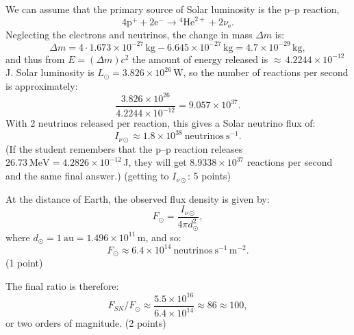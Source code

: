 We can assume that the primary source of Solar luminosity is the p--p reaction,
\[
  4\mathrm{p}^+ + 2\mathrm{e}^- \to {}^4\mathrm{He}^{2+} + 2\nu_{\mathrm{e}}.
\]
Neglecting the electrons and neutrinos, the change in mass $\Delta m$ is:
\[
  \Delta m = 4 \cdot 1.673 \times 10^{-27}\,\mathrm{kg}
  - 6.645 \times 10^{-27}\,\mathrm{kg}
  = 4.7 \times 10^{-29}\,\mathrm{kg},
\]
and thus from $E = (\Delta m)c^2$ the amount of energy released is
${\approx}\,4.2244 \times 10^{-12}$\,J. Solar luminosity is
$L_\odot = 3.826 \times 10^{26}$\,W, so the number of reactions per second is
approximately:
\[
  \frac{3.826 \times 10^{26}}{4.2244 \times 10^{-12}} = 9.057 \times 10^{37}.
\]
With 2 neutrinos released per reaction, this gives a Solar neutrino flux of:
\[
  I_{\nu\odot} \approx 1.8 \times 10^{38}\ \mathrm{neutrinos\ s^{-1}}.
\]
(If the student remembers that the p--p reaction releases
$26.73\ \mathrm{MeV} = 4.2826 \times 10^{-12}$\,J, they will get
$8.9338 \times 10^{37}$ reactions per second and the same final answer.)
\hfill(getting to $I_{\nu\odot}$: 5 points)

At the distance of Earth, the observed flux density is given by:
\[
  F_\odot = \frac{I_{\nu\odot}}{4\pi d_\odot^2},
\]
where $d_\odot = 1\ \mathrm{au} = 1.496 \times 10^{11}$\,m, and so:
\[
  F_\odot \approx 6.4 \times 10^{14}\ \mathrm{neutrinos\ s^{-1}\,m^{-2}}.
\]
\hfill(1 point)

The final ratio is therefore:
\[
  F_{SN}/F_\odot \approx \frac{5.5 \times 10^{16}}{6.4 \times 10^{14}}
  \approx 86 \approx 100,
\]
or two orders of magnitude. \hfill(2 points)

